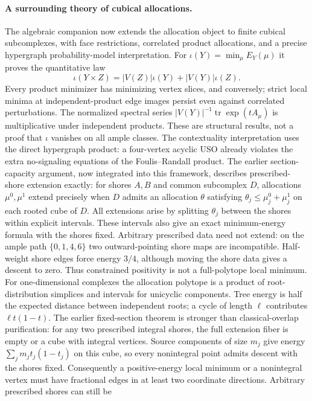 \documentclass[11pt]{article}
\theoremstyle{definition}
\begin{document}
\paragraph{A surrounding theory of cubical allocations.}
The algebraic companion now extends the allocation object to finite
cubical subcomplexes, with face restrictions, correlated product
allocations, and a precise hypergraph probability-model interpretation.
For $\iota(Y)=\min_\mu E_Y(\mu)$ it proves the quantitative law
\[
 \iota(Y\times Z)=|V(Z)|\iota(Y)+|V(Y)|\iota(Z).
\]
Every product minimizer has minimizing vertex slices, and conversely;
strict local minima at independent-product edge images persist even
against correlated perturbations. The normalized spectral series
$|V(Y)|^{-1}\operatorname{tr}\exp(tA_\mu)$ is multiplicative under
independent products. These are structural results, not a proof that
$\iota$ vanishes on all ample classes. The contextuality interpretation
uses the direct hypergraph product: a four-vertex acyclic USO already
violates the extra no-signaling equations of the Foulis--Randall product.
The earlier section-capacity argument, now integrated into this framework,
describes prescribed-shore extension exactly:
for shores $A,B$ and common subcomplex $D$, allocations $\mu^0,\mu^1$
extend precisely when $D$ admits an allocation $\theta$ satisfying
$\theta_j\leq\mu^0_j+\mu^1_j$ on each rooted cube of $D$.
All extensions arise by splitting $\theta_j$ between the shores within
explicit intervals. These intervals also give an exact minimum-energy
formula with the shores fixed. Arbitrary prescribed data need not extend:
on the ample path $\{0,1,4,6\}$ two outward-pointing shore maps are
incompatible. Half-weight shore edges force energy $3/4$, although moving
the shore data gives a descent to zero. Thus constrained positivity is
not a full-polytope local minimum.
For one-dimensional complexes the allocation polytope is a product of
root-distribution simplices and intervals for unicyclic components.
Tree energy is half the expected distance between independent roots;
a cycle of length $\ell$ contributes $\ell t(1-t)$. The earlier
fixed-section theorem is stronger than classical-overlap purification:
for any two prescribed integral shores, the full extension fiber is empty
or a cube with integral vertices. Source components of size $m_j$ give
energy $\sum_j m_jt_j(1-t_j)$ on this cube, so every nonintegral point
admits descent with the shores fixed. Consequently a positive-energy local
minimum or a nonintegral vertex must have fractional edges in at least
two coordinate directions. Arbitrary prescribed shores can still be
\end{document}
